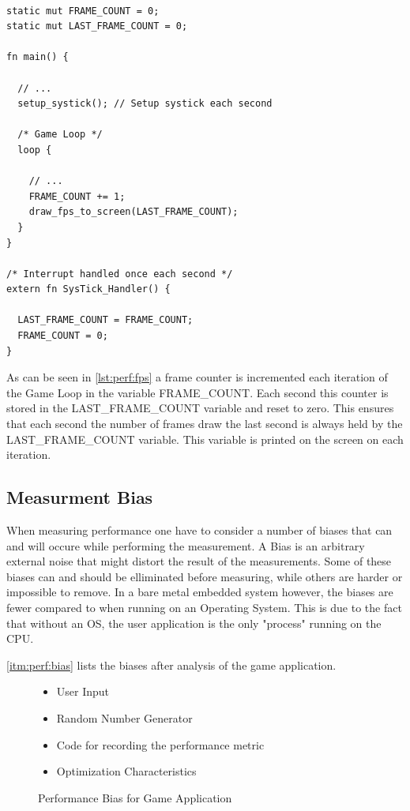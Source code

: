 \begin{listing}[H]
  \begin{verbatim}

static mut FRAME_COUNT = 0;
static mut LAST_FRAME_COUNT = 0;

fn main() {

  // ...
  setup_systick(); // Setup systick each second

  /* Game Loop */
  loop {

    // ...
    FRAME_COUNT += 1;
    draw_fps_to_screen(LAST_FRAME_COUNT);
  }
}

/* Interrupt handled once each second */
extern fn SysTick_Handler() {

  LAST_FRAME_COUNT = FRAME_COUNT;
  FRAME_COUNT = 0;
}
  \end{verbatim}
  \caption{}
  \label{lst:perf:fps}
\end{listing}

As can be seen in \autoref{lst:perf:fps} a frame counter is incremented each iteration of the Game Loop in the variable FRAME\_COUNT.
Each second this counter is stored in the LAST\_FRAME\_COUNT variable and reset to zero.
This ensures that each second the number of frames draw the last second is always held by the LAST\_FRAME\_COUNT variable.
This variable is printed on the screen on each iteration.

\subsection{Measurment Bias}
\label{sec:perf:bias}

When measuring performance one have to consider a number of biases that can and will occure while performing the measurement.
A Bias is an arbitrary external noise that might distort the result of the measurements.
Some of these biases can and should be elliminated before measuring, while others are harder or impossible to remove.
In a bare metal embedded system however, the biases are fewer compared to when running on an Operating System.
This is due to the fact that without an OS, the user application is the only "process" running on the CPU.

\autoref{itm:perf:bias} lists the biases after analysis of the game application.
\begin{figure}[H]
	\begin{itemize}
	\item User Input
	\item Random Number Generator
	\item Code for recording the performance metric
	\item Optimization Characteristics
	\end{itemize}
	\caption{Performance Bias for Game Application}
	\label{itm:perf:bias}
\end{figure}

